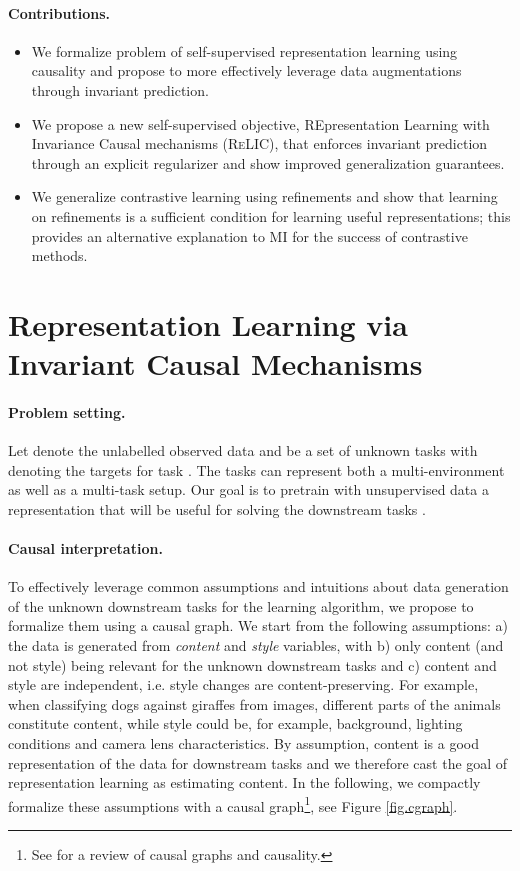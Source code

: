 \documentclass{article}
\newcommand{\relic}{\textsc{ReLIC}}
\begin{document}
\paragraph{Contributions.}
\begin{itemize}
    \item We formalize problem of self-supervised representation learning using causality and propose to more effectively leverage data augmentations through invariant prediction.
    
    \item We propose a new self-supervised objective, REpresentation Learning with Invariance Causal mechanisms (\relic), that enforces invariant prediction through an explicit regularizer and show improved generalization guarantees. 

    \item We generalize contrastive learning using refinements and show that learning on refinements is a sufficient condition for learning useful representations; this provides an alternative explanation to MI for the success of contrastive methods.
    
\end{itemize}
 \section{Representation Learning via Invariant Causal Mechanisms} \label{sec:framework}

\paragraph{Problem setting.} Let  denote the unlabelled observed data and  be a set of unknown tasks with  denoting the targets for task . 
The tasks  can represent both a multi-environment as well as a multi-task setup.
Our goal is to pretrain with unsupervised data a representation  that will be useful for solving the downstream tasks .

\paragraph{Causal interpretation.} To effectively leverage common assumptions and intuitions about data generation of the unknown downstream tasks for the learning algorithm, we propose to formalize them using a causal graph. 
We start from the following assumptions: a) the data is generated from \emph{content} and \emph{style} variables, with b) only content (and not style) being relevant for the unknown downstream tasks and c) content and style are independent, i.e. style changes are content-preserving.
For example, when classifying dogs against giraffes from images, different parts of the animals constitute content, while style could be, for example, background, lighting conditions and camera lens characteristics.
By assumption, content is a good representation of the data for downstream tasks and we therefore cast the goal of representation learning as estimating content.
In the following, we compactly formalize these assumptions with a causal graph\footnote{See \citep{peters2017elements} for a review of causal graphs and causality.}, see Figure \ref{fig.cgraph}.
\end{document}
